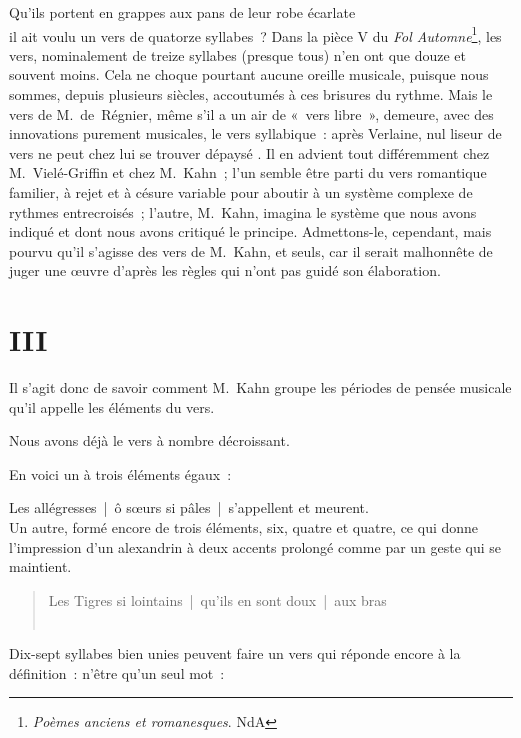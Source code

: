 \documentclass[french,twoside]{book} %
\begin{document}
Qu’ils portent en grappes aux pans de leur robe écarlate\\

\noindent il ait voulu un vers de quatorze syllabes ? Dans la pièce V du {\itshape Fol Automne}\footnote{{\itshape Poèmes anciens et romanesques}. NdA}, les vers, nominalement de treize syllabes (presque tous) n’en ont que douze et souvent moins. Cela ne choque pourtant aucune oreille musicale, puisque nous sommes, depuis plusieurs siècles, accoutumés à ces brisures du rythme. Mais le vers de M. de Régnier, même s’il a un air de « vers libre », demeure, avec des innovations purement musicales, le vers syllabique : après Verlaine, nul liseur de vers ne peut chez lui se trouver dépaysé . Il en advient tout différemment chez M. Vielé-Griffin et chez M. Kahn ; l’un semble être parti du vers romantique familier, à rejet et à césure variable pour aboutir à un système complexe de rythmes entrecroisés ; l’autre, M. Kahn, imagina le système que nous avons indiqué et dont nous avons critiqué le principe. Admettons-le, cependant, mais pourvu qu’il s’agisse des vers de M. Kahn, et seuls, car il serait malhonnête de juger une œuvre d’après les règles qui n’ont pas guidé son élaboration.
\section[{III}]{III}
\noindent Il s’agit donc de savoir comment M. Kahn groupe les périodes de pensée musicale qu’il appelle les éléments du vers.\par
Nous avons déjà le vers à nombre décroissant.\par
En voici un à trois éléments égaux :\par

Les allégresses | ô sœurs si pâles | s’appellent et meurent.\\

\noindent Un autre, formé encore de trois éléments, six, quatre et quatre, ce qui donne l’impression d’un alexandrin à deux accents prolongé comme par un geste qui se maintient.\par


\begin{verse}
Les Tigres si lointains | qu’ils en sont doux | aux bras\\
[d’Assur.]\\
\end{verse}

\noindent Dix-sept syllabes bien unies peuvent faire un vers qui réponde encore à la définition : n’être qu’un seul mot :\par
\end{document}
